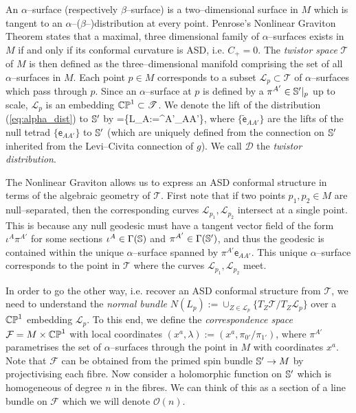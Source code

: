 An $\alpha$--surface (respectively $\beta$--surface) is a two--dimensional surface in $M$ which is tangent to an $\alpha$--($\beta$--)distribution at every point. Penrose's Nonlinear Graviton Theorem \cite{penrose} states that a 
maximal, three dimensional family of $\alpha$--surfaces exists in $M$ if and only if its conformal curvature is ASD, i.e. $C_+=0$. The \textit{twistor space} $\mathscr{T}$ of $M$ is then defined as the three--dimensional manifold comprising the set of all $\alpha$--surfaces in $M$. Each point $p\in M$ corresponds to a subset $\mathscr{L}_p\subset\mathscr{T}$ of $\alpha$--surfaces which pass through $p$. Since an $\alpha$--surface at $p$ is defined by a $\pi^{A'}\in\mathbb{S}'|_p$ up to scale, $\mathscr{L}_p$ is an embedding $\mathbb{CP}^1\subset\mathscr{T}$. We denote the lift of the distribution (\ref{eq:alpha_dist}) to $\mathbb{S}'$ by
\be \label{eq:twistor_dist}
=\{L_A:=\pi^{A'}_{AA'}\},
\ee
where $\{\tilde{\mathsf{e}}_{AA'}\}$ are the lifts of the null tetrad $\{\mathsf{e}_{AA'}\}$ to $\mathbb{S}'$ (which are uniquely defined from the connection on $\mathbb{S}'$ inherited from the Levi--Civita connection of $g$). We call $\mathcal{D}$ the \textit{twistor distribution}.

The Nonlinear Graviton allows us to express an ASD conformal structure in terms of the algebraic geometry of $\mathscr{T}$. First note that if two points $p_1,p_2\in M$ are null--separated, then the corresponding curves $\mathscr{L}_{p_1},\mathscr{L}_{p_2}$ intersect at a single point. This is because any null geodesic must have a tangent vector field of the form $\iota^A\pi^{A'}$ for some sections $\iota^A\in\Gamma(\mathbb{S})$ and $\pi^{A'}\in\Gamma(\mathbb{S}')$, and thus the geodesic is contained within the unique $\alpha$--surface spanned by $\pi^{A'}\mathsf{e}_{AA'}$. This unique $\alpha$--surface corresponds to the point in $\mathscr{T}$ where the curves $\mathscr{L}_{p_1},\mathscr{L}_{p_2}$ meet.

In order to go the other way, i.e. recover an ASD conformal structure from $\mathscr{T}$, we need to understand the \textit{normal bundle} $N(L_p):=\cup_{Z\in \mathscr{L}_p}\{T_Z\mathscr{T}/T_Z\mathscr{L}_p\}$ over a $\mathbb{CP}^1$ embedding $\mathscr{L}_p$. To this end, we define the \textit{correspondence space} $\mathcal{F}=M\times\mathbb{CP}^1$ with local coordinates $(x^a,\lambda):=(x^a,\pi_{0'}/\pi_{1'})$, where $\pi^{A'}$ parametrises the set of $\alpha$--surfaces through the point in $M$ with coordinates $x^a$. Note that $\mathcal{F}$ can be obtained from the primed spin bundle $\mathbb{S}'\rightarrow M$ by projectivising each fibre. Now consider a holomorphic function on $\mathbb{S}'$ which is homogeneous of degree $n$ in the fibres. We can think of this as a section of a line bundle on $\mathcal{F}$ which we will denote $\mathcal{O}(n)$. 

